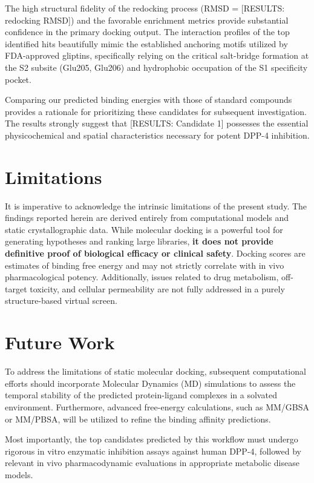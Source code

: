 \documentclass[12pt]{article}
\begin{document}
The high structural fidelity of the redocking process (RMSD = [RESULTS: redocking RMSD]) and the favorable enrichment metrics provide substantial confidence in the primary docking output. The interaction profiles of the top identified hits beautifully mimic the established anchoring motifs utilized by FDA-approved gliptins, specifically relying on the critical salt-bridge formation at the S2 subsite (Glu205, Glu206) and hydrophobic occupation of the S1 specificity pocket.

Comparing our predicted binding energies with those of standard compounds provides a rationale for prioritizing these candidates for subsequent investigation. The results strongly suggest that [RESULTS: Candidate 1] possesses the essential physicochemical and spatial characteristics necessary for potent DPP-4 inhibition.

\section{Limitations}
It is imperative to acknowledge the intrinsic limitations of the present study. The findings reported herein are derived entirely from computational models and static crystallographic data. While molecular docking is a powerful tool for generating hypotheses and ranking large libraries, \textbf{it does not provide definitive proof of biological efficacy or clinical safety}. Docking scores are estimates of binding free energy and may not strictly correlate with in vivo pharmacological potency. Additionally, issues related to drug metabolism, off-target toxicity, and cellular permeability are not fully addressed in a purely structure-based virtual screen.

\section{Future Work}
To address the limitations of static molecular docking, subsequent computational efforts should incorporate Molecular Dynamics (MD) simulations to assess the temporal stability of the predicted protein-ligand complexes in a solvated environment. Furthermore, advanced free-energy calculations, such as MM/GBSA or MM/PBSA, will be utilized to refine the binding affinity predictions. 

Most importantly, the top candidates predicted by this workflow must undergo rigorous in vitro enzymatic inhibition assays against human DPP-4, followed by relevant in vivo pharmacodynamic evaluations in appropriate metabolic disease models.
\end{document}
